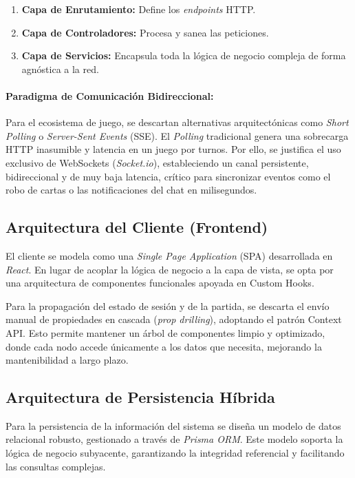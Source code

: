 \begin{enumerate}
    \item \textbf{Capa de Enrutamiento:} Define los \textit{endpoints} HTTP.
    \item \textbf{Capa de Controladores:} Procesa y sanea las peticiones.
    \item \textbf{Capa de Servicios:} Encapsula toda la lógica de negocio compleja de forma agnóstica a la red.
\end{enumerate}

\paragraph{Paradigma de Comunicación Bidireccional:}
Para el ecosistema de juego, se descartan alternativas arquitectónicas como \textit{Short Polling} o \textit{Server-Sent Events} (SSE). El \textit{Polling} tradicional genera una sobrecarga HTTP inasumible y latencia en un juego por turnos. Por ello, se justifica el uso exclusivo de WebSockets (\textit{Socket.io}), estableciendo un canal persistente, bidireccional y de muy baja latencia, crítico para sincronizar eventos como el robo de cartas o las notificaciones del chat en milisegundos.

\subsection{Arquitectura del Cliente (Frontend)}

El cliente se modela como una \textit{Single Page Application} (SPA) desarrollada en \textit{React}. En lugar de acoplar la lógica de negocio a la capa de vista, se opta por una arquitectura de componentes funcionales apoyada en Custom Hooks. 

Para la propagación del estado de sesión y de la partida, se descarta el envío manual de propiedades en cascada (\textit{prop drilling}), adoptando el patrón Context API. Esto permite mantener un árbol de componentes limpio y optimizado, donde cada nodo accede únicamente a los datos que necesita, mejorando la mantenibilidad a largo plazo.

\subsection{Arquitectura de Persistencia Híbrida}
\label{subsec:modelo_datos}

Para la persistencia de la información del sistema se diseña un modelo de datos relacional robusto, gestionado a través de \textit{Prisma ORM}. Este modelo soporta la lógica de negocio subyacente, garantizando la integridad referencial y facilitando las consultas complejas. 

